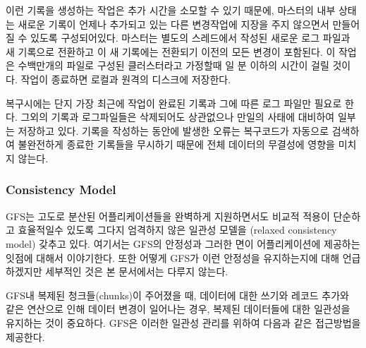 \documentclass[twocolumn]{article}
\begin{document}
  이런 기록을 생성하는 작업은 추가 시간을 소모할 수 있기 때문에, 마스터의 내부 상태는 새로운 기록이 언제나 추가되고 있는 다른 변경작업에 지장을 주지 않으면서 만들어 질 수 있도록 구성되어있다.  마스터는 별도의 스레드에서 작성된 새로운 로그 파일과 새 기록으로 전환하고 이 새 기록에는 전환되기 이전의 모든 변경이 포함된다.  이 작업은 수백만개의 파일로 구성된 클러스터라고 가정할때 일 분 이하의 시간이 걸릴 것이다.  작업이 종료하면 로컬과 원격의 디스크에 저장한다.

 복구시에는 단지 가장 최근에 작업이 완료된 기록과 그에 따른 로그 파일만 필요로 한다.  그외의 기록과 로그파일들은 삭제되어도 상관없으나 만일의 사태에 대비하여 일부는 저장하고 있다.  기록을 작성하는 동안에 발생한 오류는 복구코드가 자동으로 검색하여 불완전하게 종료한 기록들을 무시하기 때문에 전체 데이터의 무결성에 영향을 미치지 않는다.

\subsubsection{Consistency Model}

 GFS는  고도로 분산된 어플리케이션들을 완벽하게 지원하면서도 비교적 적용이 단순하고 효율적일수 있도록 그다지 엄격하지 않은 일관성 모델을 (relaxed consistency model) 갖추고 있다.  여기서는 GFS의 안정성과 그러한 면이 어플리케이션에 제공하는 잇점에 대해서 이야기한다.  또한 어떻게 GFS가 이런 안정성을 유지하는지에 대해 언급하겠지만 세부적인 것은 본 문서에서는 다루지 않는다.

GFS내 복제된 청크들(chunks)이 주어졌을 때, 데이터에 대한 쓰기와 레코드 추가와 같은 연산으로 인해 데이터 변경이 일어나는 경우,  복제된 데이터들에 대한 일관성을 유지하는 것이 중요하다. GFS은 이러한 일관성 관리를 위하여 다음과 같은 접근방법을 제공한다.
\end{document}
